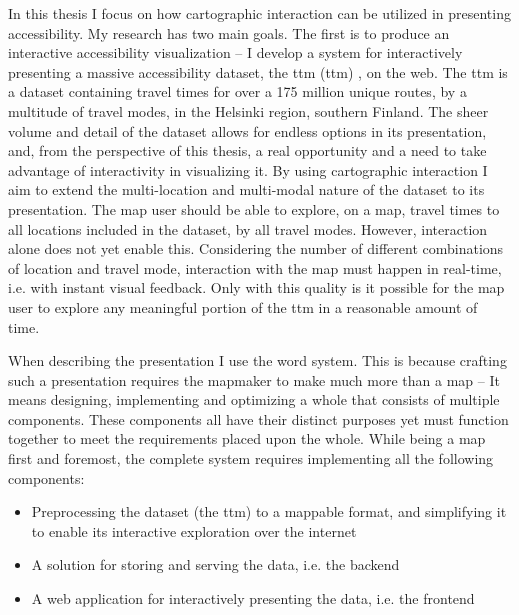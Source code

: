 
In this thesis I focus on
how cartographic interaction can be utilized in presenting accessibility.
My research has two main goals.
The first is to produce an interactive accessibility visualization --
I develop a system for interactively presenting a massive accessibility dataset,
the \acrlong{ttm} (\acrshort{ttm}) \parencite{fin2023},
on the web.  %
The \acrshort{ttm} is a dataset containing travel times for
over a 175 million unique routes, by a multitude of travel modes,
in the Helsinki region, southern Finland.
The sheer volume and detail of the dataset allows for endless options
in its presentation, and, from the perspective of this thesis,
a real opportunity and a need to take advantage of interactivity in visualizing it.
By using cartographic interaction
I aim to extend the multi-location and multi-modal nature of the dataset
to its presentation.
The map user should be able to explore, on a map,
travel times to all locations included in the dataset,
by all travel modes.
However, interaction alone does not yet enable this.
Considering the number of different combinations of location and travel mode,
interaction with the map must happen in real-time,
i.e. with instant visual feedback.
Only with this quality is it possible for the map user to
explore any meaningful portion of the \acrshort{ttm}
in a reasonable amount of time.

When describing the presentation I use the word system.
This is because crafting such a presentation
requires the mapmaker to make much more than a map --
It means designing, implementing and optimizing
a whole that consists of multiple components.
These components all have their distinct purposes yet must function together
to meet the requirements placed upon the whole.
While being a map first and foremost, the complete system
requires implementing all the following components:
\begin{itemize}
	\item Preprocessing the dataset (the \acrshort{ttm}) to a mappable format,
	and simplifying it to enable its interactive exploration over the internet
	\item A solution for storing and serving the data, i.e. the backend
	\item A web application for interactively presenting the data, i.e. the frontend
\end{itemize}

